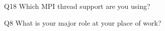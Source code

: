 \begin{description}%
\item{Q18} Which MPI thread support are you using?%
\item{Q8} What is your major role at your place of work?%
\end{description}%
